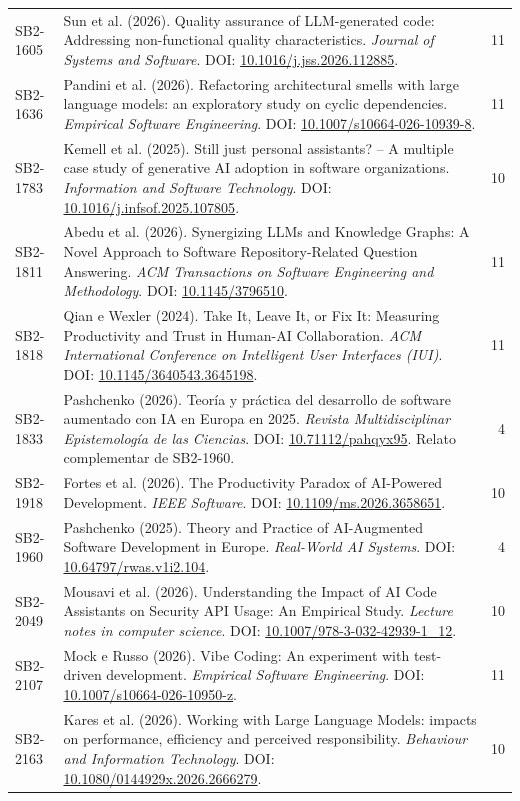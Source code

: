 \begin{small}
\begin{longtable}{lp{11.2cm}r}
SB2-1605 & Sun et al. (2026). Quality assurance of LLM-generated code: Addressing non-functional quality characteristics. \textit{Journal of Systems and Software}. DOI: \url{10.1016/j.jss.2026.112885}. & 11 \\
SB2-1636 & Pandini et al. (2026). Refactoring architectural smells with large language models: an exploratory study on cyclic dependencies. \textit{Empirical Software Engineering}. DOI: \url{10.1007/s10664-026-10939-8}. & 11 \\
SB2-1783 & Kemell et al. (2025). Still just personal assistants? – A multiple case study of generative AI adoption in software organizations. \textit{Information and Software Technology}. DOI: \url{10.1016/j.infsof.2025.107805}. & 10 \\
SB2-1811 & Abedu et al. (2026). Synergizing LLMs and Knowledge Graphs: A Novel Approach to Software Repository-Related Question Answering. \textit{ACM Transactions on Software Engineering and Methodology}. DOI: \url{10.1145/3796510}. & 11 \\
SB2-1818 & Qian e Wexler (2024). Take It, Leave It, or Fix It: Measuring Productivity and Trust in Human-AI Collaboration. \textit{ACM International Conference on Intelligent User Interfaces (IUI)}. DOI: \url{10.1145/3640543.3645198}. & 11 \\
SB2-1833 & Pashchenko (2026). Teoría y práctica del desarrollo de software aumentado con IA en Europa en 2025. \textit{Revista Multidisciplinar Epistemología de las Ciencias}. DOI: \url{10.71112/pahqyx95}. Relato complementar de SB2-1960. & 4 \\
SB2-1918 & Fortes et al. (2026). The Productivity Paradox of AI-Powered Development. \textit{IEEE Software}. DOI: \url{10.1109/ms.2026.3658651}. & 10 \\
SB2-1960 & Pashchenko (2025). Theory and Practice of AI-Augmented Software Development in Europe. \textit{Real-World AI Systems}. DOI: \url{10.64797/rwas.v1i2.104}. & 4 \\
SB2-2049 & Mousavi et al. (2026). Understanding the Impact of AI Code Assistants on Security API Usage: An Empirical Study. \textit{Lecture notes in computer science}. DOI: \url{10.1007/978-3-032-42939-1_12}. & 10 \\
SB2-2107 & Mock e Russo (2026). Vibe Coding: An experiment with test-driven development. \textit{Empirical Software Engineering}. DOI: \url{10.1007/s10664-026-10950-z}. & 11 \\
SB2-2163 & Kares et al. (2026). Working with Large Language Models: impacts on performance, efficiency and perceived responsibility. \textit{Behaviour and Information Technology}. DOI: \url{10.1080/0144929x.2026.2666279}. & 10 \\

\end{longtable}
\end{small}
